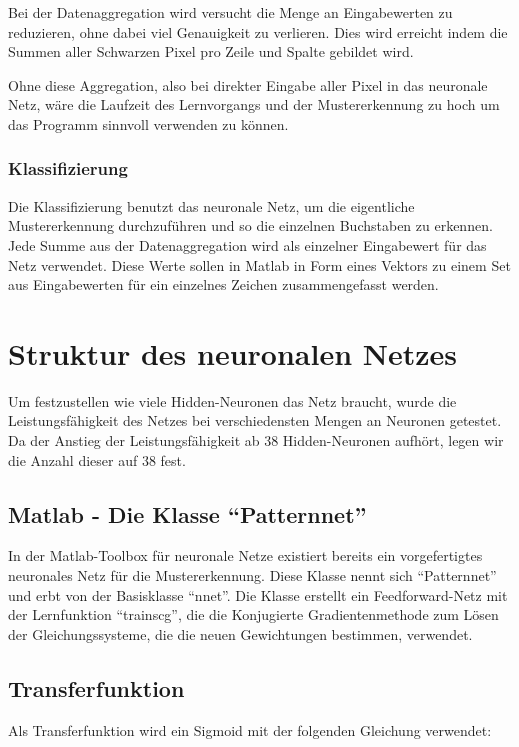 Bei der Datenaggregation wird versucht die Menge an Eingabewerten zu reduzieren,
ohne dabei viel Genauigkeit zu verlieren. Dies wird erreicht indem 
die Summen aller Schwarzen Pixel pro Zeile und Spalte gebildet wird. 

Ohne diese Aggregation, also bei direkter Eingabe aller Pixel in das
neuronale Netz, wäre die Laufzeit des Lernvorgangs und der Mustererkennung zu
hoch um das Programm sinnvoll verwenden zu können.
\subsubsection{Klassifizierung}

Die Klassifizierung benutzt das neuronale Netz, um die eigentliche
Mustererkennung durchzuführen und so die einzelnen Buchstaben zu
erkennen. Jede Summe aus der Datenaggregation wird als einzelner Eingabewert
für das Netz verwendet. Diese Werte sollen in Matlab in Form eines Vektors zu
einem Set aus Eingabewerten für ein einzelnes Zeichen zusammengefasst werden.

\section{Struktur des neuronalen Netzes}

Um festzustellen wie viele Hidden-Neuronen das Netz braucht, wurde die Leistungsfähigkeit des Netzes bei verschiedensten Mengen an Neuronen getestet. Da der Anstieg der Leistungsfähigkeit ab $38$ Hidden-Neuronen aufhört, legen wir die Anzahl dieser auf $38$ fest.

\subsection{Matlab - Die Klasse ``Patternnet''}

In der Matlab-Toolbox für neuronale Netze existiert bereits ein vorgefertigtes
neuronales Netz für die Mustererkennung. Diese Klasse nennt sich ``Patternnet''
und erbt von der Basisklasse ``nnet''. Die Klasse erstellt ein Feedforward-Netz
mit der Lernfunktion ``trainscg'', die die Konjugierte Gradientenmethode zum
Lösen der Gleichungssysteme, die die neuen Gewichtungen bestimmen, verwendet.


\subsection{Transferfunktion}
 Als Transferfunktion wird ein Sigmoid mit der folgenden Gleichung verwendet:

